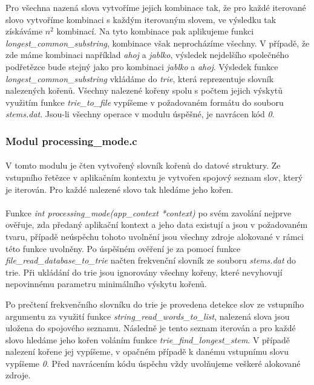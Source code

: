 ﻿\documentclass[12pt, a4paper]{article}
\begin{document}
Pro všechna nazená slova vytvoříme jejich kombinace tak, že pro každé iterované slovo vytvoříme kombinaci s každým iterovaným slovem, ve výsledku tak získáváme $n^2$ kombinací. Na tyto kombinace pak aplikujeme funkci \textit{longest\_common\_substring}, kombinace však neprocházíme všechny. V případě, že zde máme kombinaci například \textit{ahoj} a \textit{jablko}, výsledek nejdelšího společného podřetězce bude stejný jako pro kombinaci \textit{jablko} a \textit{ahoj}. Výsledek funkce \textit{longest\_common\_substring} vkládáme do \textit{trie}, která reprezentuje slovník nalezených kořenů. Všechny nalezené kořeny spolu s počtem jejich výskytů využitím funkce \textit{trie\_to\_file} vypíšeme v požadovaném formátu do souboru \textit{stems.dat}. Jsou-li všechny operace v modulu úspěšné, je navrácen kód \textit{0}.

\subsubsection{Modul processing\_mode.c}
\paragraph{}
V tomto modulu je čten vytvořený slovník kořenů do datové struktury. Ze vstupního řetězce v aplikačním kontextu je vytvořen spojový seznam slov, který je iterován. Pro každé nalezené slovo tak hledáme jeho kořen. 

\paragraph{}
Funkce \textit{int processing\_mode(app\_context *context)} po svém zavolání nejprve ověřuje, zda předaný aplikační kontext a jeho data existují a jsou v požadovaném tvaru, případě neúspěchu tohoto uvolnění jsou všechny zdroje alokované v rámci této funkce uvolněny. Po úspěšném ověření je za pomocí funkce \textit{file\_read\_database\_to\_trie} načten frekvenční slovník ze souboru \textit{stems.dat} do trie. Při ukládání do trie jsou ignorovány všechny kořeny, které nevyhovují nepovinnému parametru minimálního výskytu kořenů.
 
Po prečtení frekvenčního slovníku do trie je provedena detekce slov ze vstupního argumentu za využití funkce \textit{string\_read\_words\_to\_list}, nalezená slova jsou uložena do spojového seznamu. Následně je tento seznam iterován a pro každé slovo hledáme jeho kořen voláním funkce \textit{trie\_find\_longest\_stem}. V případě nalezení kořene jej vypíšeme, v opačném případě k danému vstupnímu slovu vypíšeme \textit{0}. Před navrácením kódu úspěchu vždy uvolňujeme veškeré alokované zdroje.
\end{document}
